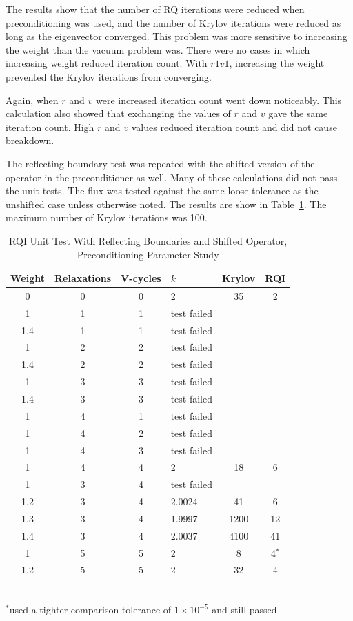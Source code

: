 The results show that the number of RQ iterations were reduced when preconditioning was used, and the number of  Krylov iterations were reduced as long as the eigenvector converged. This problem was more sensitive to increasing the weight than the vacuum problem was. There were no cases in which increasing weight reduced iteration count. With $r1v1$, increasing the weight prevented the Krylov iterations from converging. 

Again, when $r$ and $v$ were increased iteration count went down noticeably. This calculation also showed that exchanging the values of $r$ and $v$ gave the same iteration count. High $r$ and $v$ values reduced iteration count and did not cause breakdown. 

The reflecting boundary test was repeated with the shifted version of the operator in the preconditioner as well. Many of these calculations did not pass the unit tests. The flux was tested against the same loose tolerance as the unshifted case unless otherwise noted. The results are show in Table~\ref{table:RQIUnitTestReflShifted}. The maximum number of Krylov iterations was 100.
%
\begin{table}[!h]
\caption{RQI Unit Test With Reflecting Boundaries and Shifted Operator, Preconditioning Parameter Study}
\begin{center}
\begin{tabular}{c c c l c c}
\hline
Weight & Relaxations & V-cycles & $k$ & Krylov & RQI \\[0.5ex]
\hline
0    & 0 & 0 & 2 & 35 & 2 \\
1    & 1 & 1 & test failed \\
1.4 & 1 & 1 & test failed \\
1    & 2 & 2 & test failed \\
1.4 & 2 & 2 & test failed \\
1    & 3 & 3 & test failed \\
1.4 & 3 & 3 & test failed \\
1    & 4 & 1 & test failed \\
1    & 4 & 2 & test failed \\
1    & 4 & 3 & test failed \\
1    & 4 & 4 & 2 & 18 & 6 \\ 
1    & 3 & 4 & test failed \\
1.2 & 3 & 4 & 2.0024 & 41 & 6 \\
1.3 & 3 & 4 & 1.9997 & 1200 & 12 \\
1.4 & 3 & 4 & 2.0037 & 4100 & 41 \\
1    & 5 & 5 & 2 & 8 & 4$^{*}$ \\
1.2 & 5 & 5 & 2& 32 & 4 \\
\hline 
\end{tabular}\\
$^{*}$used a tighter comparison tolerance of $1 \times 10^{-5}$ and still passed
\end{center}
\label{table:RQIUnitTestReflShifted}
\end{table}

